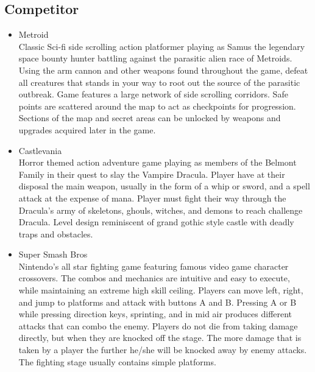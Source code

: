 \documentclass{article}
\begin{document}
\subsection*{Competitor}
    \begin{itemize}
        \item Metroid \\
        Classic Sci-fi side scrolling action platformer playing as Samus the legendary space bounty hunter battling against the parasitic alien race of Metroids. Using the arm cannon and other weapons found throughout the game, defeat all creatures that stands in your way to root out the source of the parasitic outbreak. Game features a large network of side scrolling corridors. Safe points are scattered around the map to act as checkpoints for progression. Sections of the map and secret areas can be unlocked by weapons and upgrades acquired later in the game.
        \item Castlevania \\
        Horror themed action adventure game playing as members of the Belmont Family in their quest to slay the Vampire Dracula. Player have at their disposal the main weapon, usually in the form of a whip or sword, and a spell attack at the expense of mana. Player must fight their way through the Dracula’s army of skeletons, ghouls, witches, and demons to reach challenge Dracula. Level design reminiscent of grand gothic style castle with deadly traps and obstacles.
        \item Super Smash Bros \\
        Nintendo’s all star fighting game featuring famous video game character crossovers. The combos and mechanics are intuitive and easy to execute, while maintaining an extreme high skill ceiling. Players can move left, right, and jump to platforms and attack with buttons A and B. Pressing A or B while pressing direction keys, sprinting, and in mid air produces different attacks that can combo the enemy. Players do not die from taking damage directly, but when they are knocked off the stage. The more damage that is taken by a player the further he/she will be knocked away by enemy attacks. The fighting stage usually contains simple platforms. 

    \end{itemize}
\end{document}
